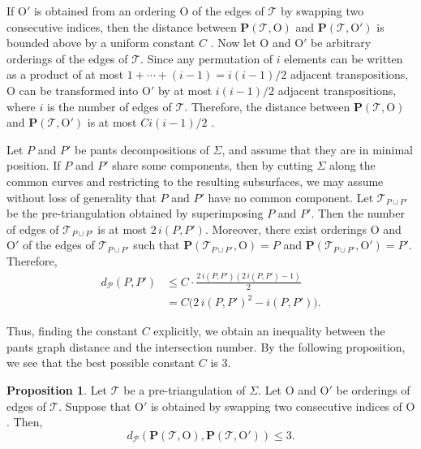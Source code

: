 \documentclass[a4paper,11pt]{amsart}
\numberwithin{equation}{section}
\theoremstyle{definition}
\newtheorem{proposition}[theorem]{Proposition}
\begin{document}
If $\mathrm{O}'$ is obtained from an ordering $\mathrm{O}$ of the edges of $\mathcal{T}$ by swapping two consecutive indices, then the distance between $\mathbf{P}(\mathcal{T},\mathrm{O})$ and $\mathbf{P}(\mathcal{T},\mathrm{O}')$ is bounded above by a uniform constant $C$ \cite[Lemma 3.18]{lackenby2024bounds}. 
Now let $\mathrm{O}$ and $\mathrm{O}'$ be arbitrary orderings of the edges of $\mathcal{T}$.
Since any permutation of $i$ elements can be written as a product of at most
$1+\cdots+(i-1)=i(i-1)/2$ adjacent transpositions, $\mathrm{O}$ can be transformed into $\mathrm{O}'$ by at most $i(i-1)/2$ adjacent transpositions, where $i$ is the number of edges of $\mathcal{T}$. 
Therefore, the distance between $\mathbf{P}(\mathcal{T},\mathrm{O})$ and $\mathbf{P}(\mathcal{T},\mathrm{O}')$ is at most $Ci(i-1)/2$
\cite[Corollary 3.19]{lackenby2024bounds}.

Let $P$ and $P'$ be pants decompositions of $\Sigma$, and assume that they are in minimal position.
If $P$ and $P'$ share some components, then by cutting $\Sigma$ along the common curves and restricting to the resulting subsurfaces, we may assume without loss of generality that $P$ and $P'$ have no common component.
Let $\mathcal{T}_{P\cup P'}$ be the pre-triangulation obtained by superimposing $P$ and $P'$.
Then the number of edges of $\mathcal{T}_{P\cup P'}$ is at most $2\,i(P,P')$.
Moreover, there exist orderings $\mathrm{O}$ and $\mathrm{O}'$ of the edges of $\mathcal{T}_{P\cup P'}$ such that $\mathbf{P}(\mathcal{T}_{P\cup P'},\mathrm{O})=P$ and $\mathbf{P}(\mathcal{T}_{P\cup P'},\mathrm{O}')=P'$.
Therefore,
\begin{equation}\label{equation:QuadraticUpperBoundsForPantsGraphDistance}
    \begin{split}
        d_{\mathcal{P}}(P,P') 
        &\leq C\cdot \frac{2\,i(P,P')(2\,i(P,P')-1)}{2} \\
        &= C\bigl(2\,i(P,P')^{2}-i(P,P')\bigr).
    \end{split}
\end{equation}

Thus, finding the constant $C$ explicitly, we obtain an inequality between the pants graph distance and the intersection number.
By the following proposition, we see that the best possible constant $C$ is $3$.

\begin{proposition}
    Let $\mathcal{T}$ be a pre-triangulation of $\Sigma$.
    Let $\mathrm{O}$ and $\mathrm{O}'$ be orderings of edges of $\mathcal{T}$.
    Suppose that $\mathrm{O}'$ is obtained by swapping two consecutive indices of $\mathrm{O}$.
    Then, 
    \begin{equation*}
        d_{\mathcal{P}}(\mathbf{P}(\mathcal{T},\mathrm{O}),\mathbf{P}(\mathcal{T},\mathrm{O}'))\leq 3.
    \end{equation*}
\end{proposition}
\end{document}
